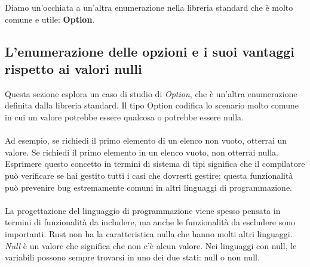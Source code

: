\documentclass[11pt,a4paper]{article}
\begin{document}
Diamo un'occhiata a un'altra enumerazione nella libreria standard che è molto comune e utile: \textbf{Option}.

\subsection{L'enumerazione delle opzioni e i suoi vantaggi rispetto ai valori nulli}

Questa sezione esplora un caso di studio di \textit{Option}, che è un'altra enumerazione definita dalla libreria standard. Il tipo Option codifica lo scenario molto comune in cui un valore potrebbe essere qualcosa o potrebbe  essere nulla.\\
\\
Ad esempio, se richiedi il primo elemento di un elenco non vuoto, otterrai un valore. Se richiedi il primo elemento in un elenco vuoto, non otterrai nulla. Esprimere questo concetto in termini di sistema di tipi significa che il compilatore può verificare se hai gestito tutti i casi che dovresti gestire; questa funzionalità può prevenire bug estremamente comuni in altri linguaggi di programmazione.\\
\\
La progettazione del linguaggio di programmazione viene spesso pensata in termini di funzionalità da includere, ma anche le funzionalità da escludere sono importanti. Rust non ha la caratteristica nulla che hanno molti altri linguaggi. \textit{Null} è un valore che significa che non c'è alcun valore. Nei linguaggi con null, le variabili possono sempre trovarsi in uno dei due stati: null o non null.
\end{document}
